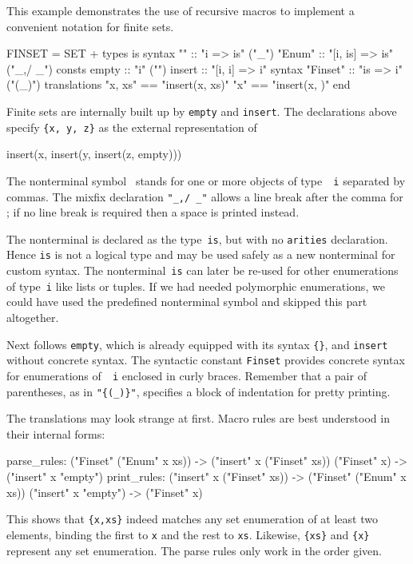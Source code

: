 This example demonstrates the use of recursive macros to implement a
convenient notation for finite sets.
\begin{ttbox}
FINSET = SET +
types
  is
syntax
  ""            :: "i => is"                ("_")
  "{\at}Enum"       :: "[i, is] => is"          ("_,/ _")
consts
  empty         :: "i"                      ("{\ttlbrace}{\ttrbrace}")
  insert        :: "[i, i] => i"
syntax
  "{\at}Finset"     :: "is => i"                ("{\ttlbrace}(_){\ttrbrace}")
translations
  "{\ttlbrace}x, xs{\ttrbrace}"     == "insert(x, {\ttlbrace}xs{\ttrbrace})"
  "{\ttlbrace}x{\ttrbrace}"         == "insert(x, {\ttlbrace}{\ttrbrace})"
end
\end{ttbox}
Finite sets are internally built up by {\tt empty} and {\tt insert}.  The
declarations above specify \verb|{x, y, z}| as the external representation
of
\begin{ttbox}
insert(x, insert(y, insert(z, empty)))
\end{ttbox}
The nonterminal symbol~ stands for one or more objects of type~{\tt
  i} separated by commas.  The mixfix declaration \hbox{\verb|"_,/ _"|}
allows a line break after the comma for ; if no
line break is required then a space is printed instead.

The nonterminal is declared as the type~{\tt is}, but with no {\tt arities}
declaration.  Hence {\tt is} is not a logical type and may be used safely as
a new nonterminal for custom syntax.  The nonterminal~{\tt is} can later be
re-used for other enumerations of type~{\tt i} like lists or tuples. If we
had needed polymorphic enumerations, we could have used the predefined
nonterminal symbol  and skipped this part altogether.

Next follows {\tt empty}, which is already equipped with its syntax
\verb|{}|, and {\tt insert} without concrete syntax.  The syntactic
constant {\tt\at Finset} provides concrete syntax for enumerations of~{\tt
  i} enclosed in curly braces.  Remember that a pair of parentheses, as in
\verb|"{(_)}"|, specifies a block of indentation for pretty printing.

The translations may look strange at first.  Macro rules are best
understood in their internal forms:
\begin{ttbox}
parse_rules:
  ("{\at}Finset" ("{\at}Enum" x xs))  ->  ("insert" x ("{\at}Finset" xs))
  ("{\at}Finset" x)  ->  ("insert" x "empty")
print_rules:
  ("insert" x ("{\at}Finset" xs))  ->  ("{\at}Finset" ("{\at}Enum" x xs))
  ("insert" x "empty")  ->  ("{\at}Finset" x)
\end{ttbox}
This shows that \verb|{x,xs}| indeed matches any set enumeration of at least
two elements, binding the first to {\tt x} and the rest to {\tt xs}.
Likewise, \verb|{xs}| and \verb|{x}| represent any set enumeration.
The parse rules only work in the order given.


